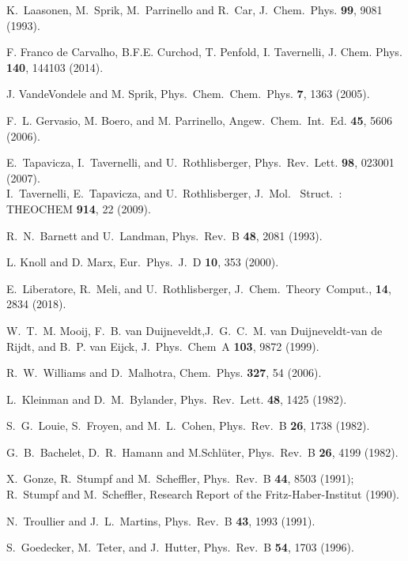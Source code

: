 \documentclass[twoside,10pt,titlepage,a4paper]{article}
\begin{document}
\begin{thebibliography}{999}
    K.~Laasonen, M.~Sprik, M.~Parrinello and R.~Car,
    J.~Chem.~Phys. {\bf 99}, 9081 (1993).

 F. Franco de Carvalho, B.F.E. Curchod, T. Penfold, I. Tavernelli,
     J. Chem. Phys.  {\bf 140}, 144103 (2014).

 J. VandeVondele and M. Sprik,
     Phys.~Chem.~Chem.~Phys. {\bf 7}, 1363 (2005).

 F.~L. Gervasio, M. Boero, and M. Parrinello,
     Angew.~Chem.~Int.~Ed. {\bf 45}, 5606 (2006).

    E.~Tapavicza, I.~Tavernelli, and U.~Rothlisberger,
    Phys.~Rev.~Lett. {\bf 98}, 023001 (2007).\\
    I.~Tavernelli, E.~Tapavicza, and U.~Rothlisberger, 
    J.~Mol.~ Struct.~: THEOCHEM {\bf 914}, 22 (2009).

 R.~N.~Barnett and U.~Landman,
    Phys.~Rev.~B {\bf 48}, 2081 (1993).

    L. Knoll and D. Marx,
    Eur.~Phys.~J.~D {\bf 10}, 353 (2000).

   E.~Liberatore, R.~Meli, and U.~Rothlisberger,
   J.~Chem.~Theory~Comput., {\bf 14}, 2834 (2018).

    W.~T.~M. Mooij, F.~B. van Duijneveldt,J.~G.~C.~M. van Duijneveldt-van de Rijdt,
    and B.~P. van Eijck, J.~Phys.~Chem~A {\bf 103}, 9872 (1999).

    R.~W.~Williams and D.~Malhotra, Chem.~Phys. {\bf 327}, 54 (2006).

    L.~Kleinman and D.~M.~Bylander,
    Phys.~Rev.~Lett. {\bf 48}, 1425 (1982).

    S.~G.~Louie, S.~Froyen, and M.~L.~Cohen,
    Phys.~Rev.~B {\bf 26}, 1738 (1982). 

    G.~B.~Bachelet, D.~R.~Hamann and M.Schl\"uter,
    Phys.~Rev.~B {\bf 26}, 4199 (1982).

    X.~Gonze, R.~Stumpf and M.~Scheffler,
    Phys.~Rev.~B {\bf 44}, 8503 (1991);
    R.~Stumpf and M.~Scheffler,
    Research Report of the Fritz-Haber-Institut (1990).

    N.~Troullier and J.~L.~Martins,
    Phys.~Rev.~B {\bf 43}, 1993 (1991).

    S.~Goedecker, M.~Teter, and J.~Hutter,
    Phys.~Rev.~B {\bf 54}, 1703 (1996).


\end{thebibliography}
\end{document}
